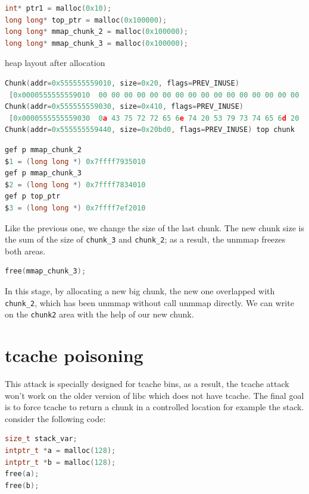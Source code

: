 \documentclass{masterthesis}
\newcommand*\tch{tcache}
\begin{document}
\begin{lstlisting}[language=c,frame=tlrb]
int* ptr1 = malloc(0x10);
long long* top_ptr = malloc(0x100000);
long long* mmap_chunk_2 = malloc(0x100000);
long long* mmap_chunk_3 = malloc(0x100000);
\end{lstlisting}

heap layout after allocation

\begin{lstlisting}[language=c,frame=tlrb]
Chunk(addr=0x555555559010, size=0x20, flags=PREV_INUSE)
 [0x0000555555559010  00 00 00 00 00 00 00 00 00 00 00 00 00 00 00 00 ................]
Chunk(addr=0x555555559030, size=0x410, flags=PREV_INUSE)
 [0x0000555555559030  0a 43 75 72 72 65 6e 74 20 53 79 73 74 65 6d 20 .Current System ]
Chunk(addr=0x555555559440, size=0x20bd0, flags=PREV_INUSE) top chunk
\end{lstlisting}

\begin{lstlisting}[language=c,frame=tlrb]
gef p mmap_chunk_2
$1 = (long long *) 0x7ffff7935010
gef p mmap_chunk_3
$2 = (long long *) 0x7ffff7834010
gef p top_ptr
$3 = (long long *) 0x7ffff7ef2010
\end{lstlisting}

Like the previous one, we change the size of the last chunk. The new chunk size is the sum of the size of \lstinline{chunk_3} and \lstinline{chunk_2}; as a result, the unmmap freezes both areas.

\begin{lstlisting}[language=c,frame=tlrb]
free(mmap_chunk_3);
\end{lstlisting}

In this stage, by allocating a new big chunk, the new one overlapped with \lstinline{chunk_2}, which has been unmmap without call unmmap directly. We can write on the \lstinline{chunk2} area with the help of our new chunk.

\section{\tch{} poisoning}
This attack is specially designed for \tch{} bins, as a result, the \tch{} attack won't work on the older version of libc which does not have \tch{}. The final goal is to force \tch{} to return a chunk in a controlled location for example the stack. consider the following code:

\begin{lstlisting}[language=c,frame=tlrb]
size_t stack_var;
intptr_t *a = malloc(128);
intptr_t *b = malloc(128);
free(a);
free(b);
\end{lstlisting}
\end{document}
